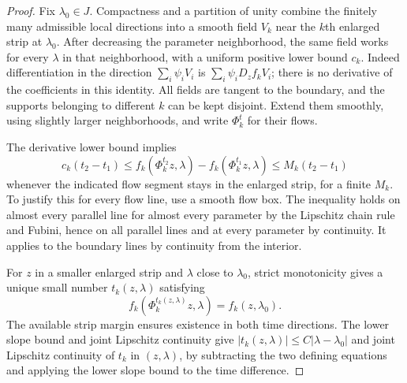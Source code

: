 \begin{proof}
Fix $\lambda_0\in J$.  Compactness and a partition of unity combine
the finitely many admissible local directions into a smooth field
$V_k$ near the $k$th enlarged strip at $\lambda_0$.  After decreasing
the parameter neighborhood, the same field works for every
$\lambda$ in that neighborhood, with a uniform positive lower bound
$c_k$.  Indeed differentiation in the direction
$\sum_i\psi_iV_i$ is $\sum_i\psi_iD_zf_kV_i$; there is no
derivative of the coefficients in this identity.  All fields are
tangent to the boundary, and the supports belonging to different
$k$ can be kept disjoint.  Extend them smoothly, using slightly
larger neighborhoods, and write $\Phi_k^t$ for their flows.

The derivative lower bound implies
\[
 c_k(t_2-t_1)\leq
 f_k(\Phi_k^{t_2}z,\lambda)-f_k(\Phi_k^{t_1}z,\lambda)
 \leq M_k(t_2-t_1)
\]
whenever the indicated flow segment stays in the enlarged strip,
for a finite $M_k$.  To justify this for every flow line, use a
smooth flow box.  The inequality holds on almost every parallel
line for almost every parameter by the Lipschitz chain rule and
Fubini, hence on all parallel lines and at every parameter by
continuity.  It applies to the boundary lines by continuity from the
interior.

For $z$ in a smaller enlarged strip and $\lambda$ close to
$\lambda_0$, strict monotonicity gives a unique small number
$t_k(z,\lambda)$ satisfying
\[
 f_k(\Phi_k^{t_k(z,\lambda)}z,\lambda)
       =f_k(z,\lambda_0).
\]
The available strip margin ensures existence in both time directions.
The lower slope bound and joint Lipschitz continuity give
$|t_k(z,\lambda)|\leq C|\lambda-\lambda_0|$ and joint
Lipschitz continuity of $t_k$ in $(z,\lambda)$, by subtracting the
two defining equations and applying the lower slope bound to the
time difference.


\end{proof}
